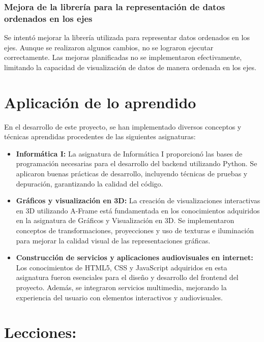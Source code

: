 \documentclass[a4paper, 12pt]{book}
\begin{document}
\subsubsection{Mejora de la librería para la representación de datos ordenados en los ejes}
Se intentó mejorar la librería utilizada para representar datos ordenados en los ejes. Aunque se realizaron algunos cambios, no se lograron ejecutar correctamente. Las mejoras planificadas no se implementaron efectivamente, limitando la capacidad de visualización de datos de manera ordenada en los ejes.

\section{Aplicación de lo aprendido}
\label{sec:aplicacion}

En el desarrollo de este proyecto, se han implementado diversos conceptos y técnicas aprendidas procedentes de las siguientes asignaturas:

\begin{itemize}
    \item \textbf{Informática I: } La asignatura de Informática I proporcionó las bases de programación necesarias para el desarrollo del backend utilizando Python. Se aplicaron buenas prácticas de desarrollo, incluyendo técnicas de pruebas y depuración, garantizando la calidad del código.
    \item \textbf{Gráficos y visualización en 3D: } La creación de visualizaciones interactivas en 3D utilizando A-Frame está fundamentada en los conocimientos adquiridos en la asignatura de Gráficos y Visualización en 3D. Se implementaron conceptos de transformaciones, proyecciones y uso de texturas e iluminación para mejorar la calidad visual de las representaciones gráficas.
    \item \textbf{Construcción de servicios y aplicaciones audiovisuales en internet: } Los conocimientos de HTML5, CSS y JavaScript adquiridos en esta asignatura fueron esenciales para el diseño y desarrollo del frontend del proyecto. Además, se integraron servicios multimedia, mejorando la experiencia del usuario con elementos interactivos y audiovisuales.
    
\end{itemize}


\section{Lecciones:}
\label{sec:lecciones_aprendidas}
\end{document}
